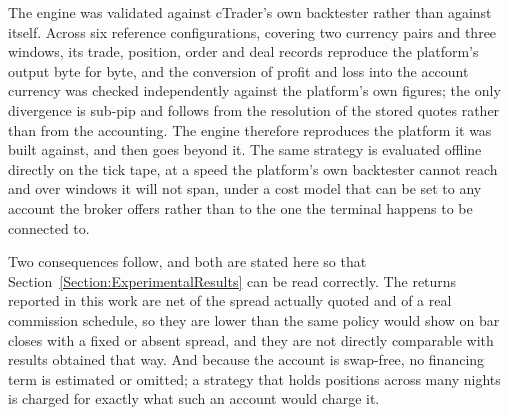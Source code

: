 The engine was validated against cTrader's own backtester rather than against itself. Across six reference configurations, covering two currency pairs and three windows, its trade, position, order and deal records reproduce the platform's output byte for byte, and the conversion of profit and loss into the account currency was checked independently against the platform's own figures; the only divergence is sub-pip and follows from the resolution of the stored quotes rather than from the accounting. The engine therefore reproduces the platform it was built against, and then goes beyond it. The same strategy is evaluated offline directly on the tick tape, at a speed the platform's own backtester cannot reach and over windows it will not span, under a cost model that can be set to any account the broker offers rather than to the one the terminal happens to be connected to.

Two consequences follow, and both are stated here so that Section~\ref{Section:ExperimentalResults} can be read correctly. The returns reported in this work are net of the spread actually quoted and of a real commission schedule, so they are lower than the same policy would show on bar closes with a fixed or absent spread, and they are not directly comparable with results obtained that way. And because the account is swap-free, no financing term is estimated or omitted; a strategy that holds positions across many nights is charged for exactly what such an account would charge it.